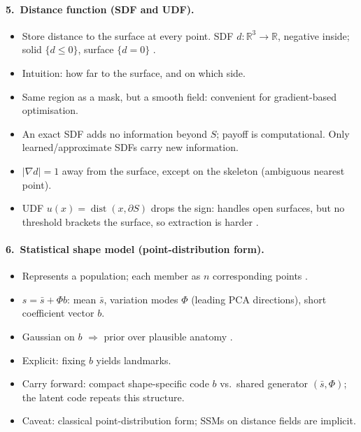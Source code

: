%
\paragraph{5.~Distance function (SDF and UDF).}
\begin{itemize}
    \item Store distance to the surface at every point. SDF $d : \mathbb{R}^3 \to \mathbb{R}$, negative inside; solid $\{d \le 0\}$, surface $\{d = 0\}$ \citep{osher1988fronts, park2019deepsdf}.
    \item Intuition: how far to the surface, and on which side.
    \item Same region as a mask, but a smooth field: convenient for gradient-based optimisation.
    \item An exact SDF adds no information beyond $S$; payoff is computational. Only learned/approximate SDFs carry new information.
    \item $|\nabla d| = 1$ away from the surface, except on the skeleton (ambiguous nearest point).
    \item UDF $u(x) = \operatorname{dist}(x, \partial S)$ drops the sign: handles open surfaces, but no threshold brackets the surface, so extraction is harder \citep{chibane2020ndf}.
\end{itemize}

%
\paragraph{6.~Statistical shape model (point-distribution form).}
\begin{itemize}
    \item Represents a population; each member as $n$ corresponding points \citep{cootes1995active, heimann2009statistical}.
    \item $s = \bar{s} + \Phi b$: mean $\bar{s}$, variation modes $\Phi$ (leading PCA directions), short coefficient vector $b$.
    \item Gaussian on $b$ $\Rightarrow$ prior over plausible anatomy \citep{ambellan2019statistical}.
    \item Explicit: fixing $b$ yields landmarks.
    \item Carry forward: compact shape-specific code $b$ vs.\ shared generator $(\bar{s}, \Phi)$; the latent code repeats this structure.
    \item Caveat: classical point-distribution form; SSMs on distance fields are implicit.
\end{itemize}

